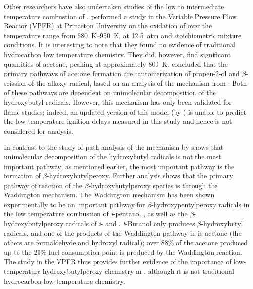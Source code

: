 \documentclass[../main.tex]{subfiles}
\begin{document}
Other researchers have also undertaken studies of the low to intermediate
temperature combustion of \tBuOH{}. \textcite{Lefkowitz2012}
performed a study in the Variable Pressure Flow Reactor (VPFR) at Princeton
University on the oxidation of \tBuOH{} over the temperature range
from \SIrange{680}{950}{\kelvin}, at \SI{12.5}{atm} and stoichiometric mixture conditions. It is
interesting to note that they found no evidence of traditional hydrocarbon
low temperature chemistry. They did, however, find significant quantities of
acetone, peaking at approximately \SI{800}{\kelvin}. \textcite{Lefkowitz2012} concluded
that the primary pathways of acetone formation are tautomerization of
propen-2-ol and $\beta$-scission of the alkoxy radical, based on an analysis
of the mechanism from \textcite{Grana2010}. Both of these pathways are
dependent on unimolecular decomposition of the hydroxybutyl radicals. However,
this mechanism has only been validated for flame studies; indeed, an updated
version of this model (by \textcite{Frassoldati2012}) is unable to predict the
low-temperature ignition delays measured in this study and hence is not
considered for analysis.

In contrast to the study of \textcite{Lefkowitz2012} path analysis of the
mechanism by \textcite{Sarathy2012} shows that unimolecular decomposition
of the hydroxybutyl radicals is not the most important pathway; as mentioned
earlier, the most important pathway is the formation of
$\beta$-hydroxybutylperoxy. Further analysis shows that the primary pathway of
reaction of the \tBuOH{} $\beta$-hydroxybutylperoxy species is
through the Waddington mechanism. The Waddington mechanism has been shown
experimentally to be an important pathway for $\beta$-hydroxypentylperoxy
radicals in the low temperature combustion of \textit{i}-pentanol
\cite{Welz2012}, as well as the $\beta$-hydroxybutylperoxy radicals of
\textit{i}- and \tBuOH{} \cite{Welz2013b}. \textit{t}-Butanol only
produces $\beta$-hydroxybutyl radicals, and one of the products of the
Waddington pathway in \tBuOH{} is acetone (the others are
formaldehyde and hydroxyl radical); over 88\% of the acetone produced up to the
20\% fuel consumption point is produced by the Waddington reaction. The study
in the VPFR thus provides further evidence of the importance of low-temperature
hydroxybutylperoxy chemistry in \tBuOH{}, although it is not
traditional hydrocarbon low-temperature chemistry.
\end{document}
